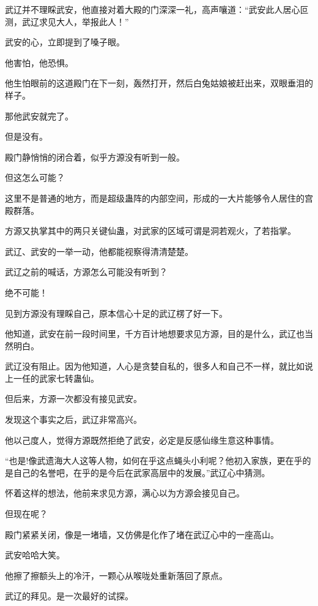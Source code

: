 
\begin{this_body}

武辽并不理睬武安，他直接对着大殿的门深深一礼，高声嚷道：“武安此人居心叵测，武辽求见大人，举报此人！”

武安的心，立即提到了嗓子眼。

他害怕，他恐惧。

他生怕眼前的这道殿门在下一刻，轰然打开，然后白兔姑娘被赶出来，双眼垂泪的样子。

那他武安就完了。

但是没有。

殿门静悄悄的闭合着，似乎方源没有听到一般。

但这怎么可能？

这里不是普通的地方，而是超级蛊阵的内部空间，形成的一大片能够令人居住的宫殿群落。

方源又执掌其中的两只关键仙蛊，对武家的区域可谓是洞若观火，了若指掌。

武辽、武安的一举一动，他都能视察得清清楚楚。

武辽之前的喊话，方源怎么可能没有听到？

绝不可能！

见到方源没有理睬自己，原本信心十足的武辽楞了好一下。

他知道，武安在前一段时间里，千方百计地想要求见方源，目的是什么，武辽也当然明白。

武辽没有阻止。因为他知道，人心是贪婪自私的，很多人和自己不一样，就比如说上一任的武家七转蛊仙。

但后来，方源一次都没有接见武安。

发现这个事实之后，武辽非常高兴。

他以己度人，觉得方源既然拒绝了武安，必定是反感仙缘生意这种事情。

“也是!像武遗海大人这等人物，如何在乎这点蝇头小利呢？他初入家族，更在乎的是自己的名誉吧，在乎的是今后在武家高层中的发展。”武辽心中猜测。

怀着这样的想法，他前来求见方源，满心以为方源会接见自己。

但现在呢？

殿门紧紧关闭，像是一堵墙，又仿佛是化作了堵在武辽心中的一座高山。

武安哈哈大笑。

他擦了擦额头上的冷汗，一颗心从喉咙处重新落回了原点。

武辽的拜见。是一次最好的试探。


\end{this_body}
